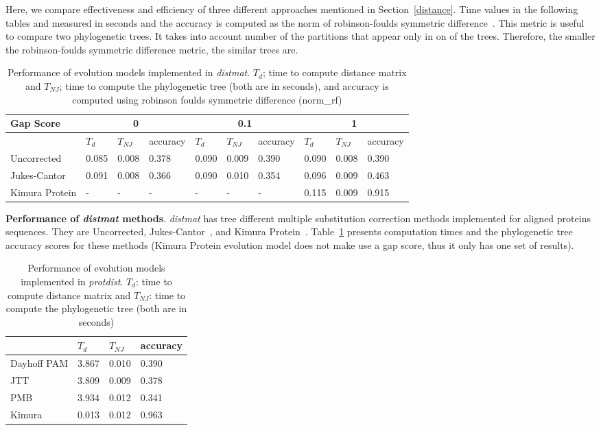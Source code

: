 \documentclass[11pt,letterpaper]{article}
\theoremstyle{definition}
\begin{document}
Here, we compare effectiveness and efficiency of three different approaches mentioned in Section~\ref{distance}. Time values in the following tables and measured in seconds and the accuracy is computed as the norm of robinson-foulds symmetric difference~\cite{robinson1981comparison}. 
This metric is useful to compare two phylogenetic trees. It takes into account number of the partitions that appear only in on of the trees. Therefore, the smaller the robinson-foulds symmetric difference metric, the similar trees are.

\begin{table}[t]
\centering
	\begin{tabular}{l|lll|lll|lll}

Gap Score	& \multicolumn{3}{c}{0} & \multicolumn{3}{c}{0.1} &  \multicolumn{3}{c}{1} \\
\hline
&	$T_d$	& $T_{NJ}$	& accuracy &	$T_d$	& $T_{NJ}$	& accuracy &	$T_d$	& $T_{NJ}$	& accuracy \\
\hline
Uncorrected		&	0.085	&	0.008	&	0.378	&	0.090	&	0.009	&	0.390	&	0.090	&	0.008	&	0.390	\\
Jukes-Cantor	&	0.091	&	0.008	&	0.366	&	0.090	&	0.010	&	0.354	&	0.096	&	0.009	&	0.463	\\
Kimura Protein	&	-	&	-	&	-	&	-	&	-	&	-	&	0.115	&	0.009	&	0.915	\\
\hline
\end{tabular}
\caption{Performance of evolution models implemented in \textit{distmat}. 
$T_d$; time to compute distance matrix and $T_{NJ}$; time to compute the phylogenetic tree (both are in seconds), and accuracy is computed using robinson foulds symmetric difference \cite{robinson1981comparison} (norm\_rf)}\label{tab:dist1}
\end{table}

\textbf{Performance of \textit{distmat} methods}. \textit{distmat} has tree different multiple substitution correction methods implemented for aligned proteins sequences. They are Uncorrected, Jukes-Cantor~\cite{jukes1969evolution}, and Kimura Protein~\cite{kimura1980simple}. Table~\ref{tab:dist1}  presents computation times and the phylogenetic tree accuracy scores for these methods (Kimura Protein evolution model does not make use a gap score, thus it only has one set of results).

\begin{table}[t]
\centering
	\begin{tabular}{l|lll}
	\hline
	&	$T_d$	& $T_{NJ}$	& accuracy  \\
	\hline
	Dayhoff PAM	&	3.867	&	0.010	&	0.390	\\
	JTT			&	3.809	&	0.009	&	0.378	\\
	PMB			&	3.934	&	0.012	&	0.341	\\
	Kimura		&	0.013	&	0.012	&	0.963	\\
	\hline
	\end{tabular}
\caption{Performance of evolution models implemented in \textit{protdist}. 
$T_d$: time to compute distance matrix and $T_{NJ}$: time to compute the phylogenetic tree (both are in seconds)}\label{tab:dist2}
\end{table}
\end{document}
